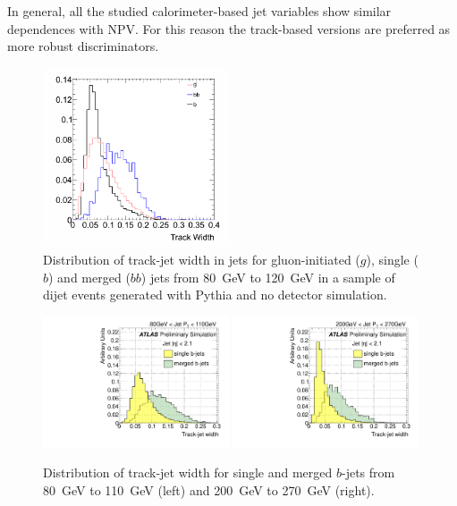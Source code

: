  In general, all the studied calorimeter-based jet variables show similar dependences with NPV. For this reason the track-based versions are preferred as more robust discriminators.


\begin{figure}[tp]
\centering
\includegraphics[width=0.49\textwidth]{FIGS/TEMPFigs/PythisStandalone/MaxPlots/trkWidth_bb_b_g_J3_PT80.png}
\caption{Distribution of track-jet width in jets for gluon-initiated ($g$), single ($b$) and merged ($bb$) jets from 80~GeV to 120~GeV in a sample of dijet events generated with {\sc Pythia} and no detector simulation.}
\label{fig:trkwidthsinglemergedPYTHIAgluon}
\end{figure}

\begin{figure}[tp]
\centering
\includegraphics[width=0.49\textwidth]{FIGS/VarsSingleMerged/trkWidth080.pdf}
\includegraphics[width=0.49\textwidth]{FIGS/VarsSingleMerged/trkWidth200.pdf}
\caption{Distribution of track-jet width for single and merged $b$-jets from 80~GeV to 110~GeV (left) and 200~GeV to 270~GeV (right).}
\label{fig:trkwidthsinglemerged}
\end{figure}


